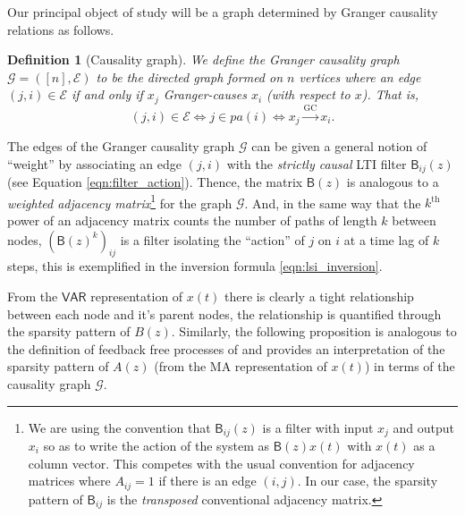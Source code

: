 \documentclass{statsoc}
\def\gc{\overset{\text{GC}}{\rightarrow}}  %
\def\gcg{\mathcal{G}}  %
\def\gcge{\mathcal{E}}  %
\def\VAR{\mathsf{VAR}}  %
\def\B{\mathsf{B}}  %
\newcommand{\pa}[1]{pa(#1)}  %
\newtheorem{definition}{Definition}
\begin{document}
Our principal object of study will be a graph determined by
Granger causality relations as follows.

\begin{definition}[Causality graph]
  We define the Granger causality graph $\gcg = ([n], \gcge)$ to be the directed
  graph formed on $n$ vertices where an edge $(j, i) \in \gcge$ if and
  only if $x_j$ Granger-causes $x_i$ (with respect to $x$).  That is,
  $$(j, i) \in \gcge \iff j \in \pa{i} \iff x_j \gc x_i.$$
\end{definition}

The edges of the Granger causality graph $\gcg$ can be given a general
notion of ``weight'' by associating an edge $(j, i)$ with the
\textit{strictly causal} LTI filter $\B_{ij}(z)$ (see Equation
\eqref{eqn:filter_action}).  Thence, the matrix $\B(z)$ is analogous
to a \textit{weighted adjacency matrix}\footnote{\footnotesize We are using the
  convention that $\B_{ij}(z)$ is a filter with input $x_j$ and output
  $x_i$ so as to write the action of the system as $\B(z)x(t)$ with
  $x(t)$ as a column vector.  This competes with the usual convention
  for adjacency matrices where $A_{ij} = 1$ if there is an edge
  $(i, j)$.  In our case, the sparsity pattern of $\B_{ij}$ is the
  \textit{transposed} conventional adjacency matrix.} for the graph $\gcg$.  And,
in the same way that the $k^{\text{th}}$ power of an adjacency matrix
counts the number of paths of length $k$ between nodes,
$(\B(z)^k)_{ij}$ is a filter isolating the ``action'' of $j$ on $i$ at
a time lag of $k$ steps, this is exemplified in the inversion formula
\eqref{eqn:lsi_inversion}.

From the $\VAR$ representation of $x(t)$ there is clearly a tight
relationship between each node and it's parent nodes, the relationship
is quantified through the sparsity pattern of $B(z)$.  Similarly, the
following proposition is analogous to the definition of feedback free
processes of \cite{caines1975feedback} and provides an interpretation
of the sparsity pattern of $A(z)$ (from the MA representation of
$x(t)$) in terms of the causality graph $\gcg$.
\end{document}
